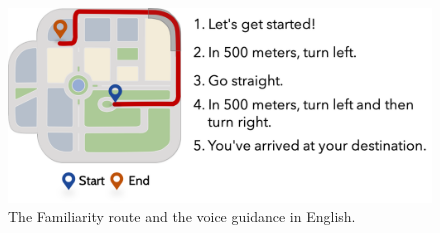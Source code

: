 \begin{figure}[h]
  \centering
  \includegraphics[scale=0.7]{figures/b-familiarity-en.png}
  \caption{The Familiarity route and the voice guidance in English.}
  \label{fig:b-fami}
\end{figure}

